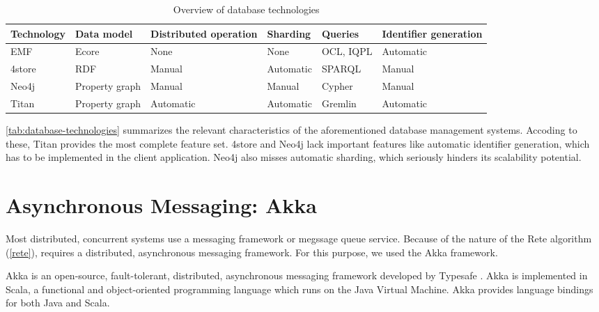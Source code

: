 \begin{table}[htb]

\centering
\begin{tabular}{ | l | l | m{2cm} | l | l | m{2cm} | }

\hline
\bf Technology & 
\bf Data model & 
\bf Distributed operation  & 
\bf Sharding   & 
\bf Queries    & 
\bf Identifier generation \tabularnewline \hline\hline
EMF     & Ecore           & None       & None       & OCL, IQPL & Automatic  \\ \hline
4store  & RDF             & Manual     & Automatic  & SPARQL    & Manual     \\ \hline
Neo4j   & Property graph  & Manual     & Manual     & Cypher    & Manual     \\ \hline
Titan   & Property graph  & Automatic  & Automatic  & Gremlin   & Automatic  \\ \hline

\end{tabular}
\caption{Overview of database technologies}
\label{tab:database-technologies}

\end{table}

\autoref{tab:database-technologies} summarizes the relevant characteristics of the aforementioned database management systems. Accoding to these, Titan provides the most complete feature set. 4store and Neo4j lack important features like automatic identifier generation, which has to be implemented in the client application. Neo4j also misses automatic sharding, which seriously hinders its scalability potential. 


\section{Asynchronous Messaging: Akka}

Most distributed, concurrent systems use a messaging framework or megssage queue service. Because of the nature of the Rete algorithm (\autoref{rete}), \iqd{} requires a distributed, asynchronous messaging framework. For this purpose, we used the Akka framework.

Akka is an open-source, fault-tolerant, distributed, asynchronous messaging framework developed by Typesafe \cite{Akka}.
Akka is implemented in Scala, a functional and object-oriented programming language which runs on the Java Virtual Machine. Akka provides language bindings for both Java and Scala.

